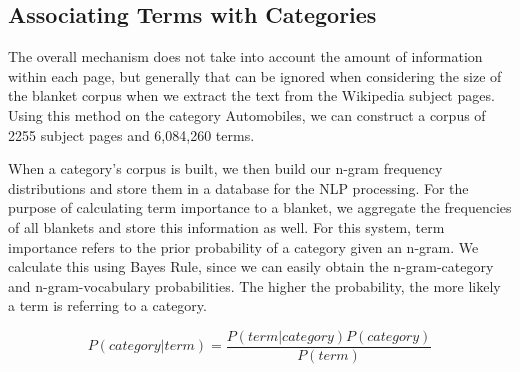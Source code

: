 \subsection{Associating Terms with Categories}

The overall mechanism does not take into account the amount of
information within each page, but generally that can be ignored when
considering the size of the blanket corpus when we extract the text
from the Wikipedia subject pages. Using this method on the category
Automobiles, we can construct a corpus of 2255 subject pages and
6,084,260 terms.

When a category's corpus is built, we then build our n-gram frequency
distributions and store them in a database for the NLP processing. For
the purpose of calculating term importance to a blanket, we aggregate
the frequencies of all blankets and store this information as
well. For this system, term importance refers to the prior probability
of a category given an n-gram. We calculate this using Bayes Rule,
since we can easily obtain the n-gram-category and n-gram-vocabulary
probabilities. The higher the probability, the more likely a term is
referring to a category.

\begin{equation}
P (category | term) = \frac{P(term | category) P(category)}{P(term)}
\end{equation}
